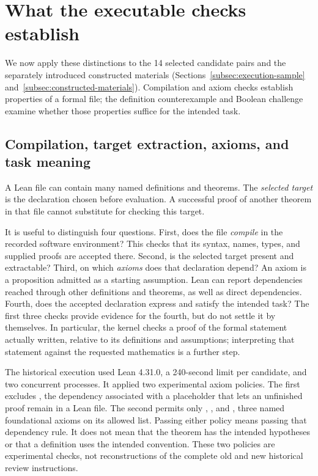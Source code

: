 \section{What the executable checks establish}
\label{sec:audit}
We now apply these distinctions to the 14 selected candidate pairs and the separately introduced constructed materials (Sections~\ref{subsec:execution-sample} and~\ref{subsec:constructed-materials}). Compilation and axiom checks establish properties of a formal file; the definition counterexample and Boolean challenge examine whether those properties suffice for the intended task.

\subsection{Compilation, target extraction, axioms, and task meaning}
\label{subsec:lean-checks}
A Lean file can contain many named definitions and theorems. The \emph{selected target} is the declaration chosen before evaluation. A successful proof of another theorem in that file cannot substitute for checking this target.

It is useful to distinguish four questions. First, does the file \emph{compile} in the recorded software environment? This checks that its syntax, names, types, and supplied proofs are accepted there. Second, is the selected target present and extractable? Third, on which \emph{axioms} does that declaration depend? An axiom is a proposition admitted as a starting assumption. Lean can report dependencies reached through other definitions and theorems, as well as direct dependencies. Fourth, does the accepted declaration express and satisfy the intended task? The first three checks provide evidence for the fourth, but do not settle it by themselves. In particular, the kernel checks a proof of the formal statement actually written, relative to its definitions and assumptions; interpreting that statement against the requested mathematics is a further step\cite{leanaxioms,leanvalidation}.

The historical execution used Lean 4.31.0, a 240-second limit per candidate, and two concurrent processes. It applied two experimental axiom policies. The first excludes , the dependency associated with a placeholder that lets an unfinished proof remain in a Lean file. The second permits only , , and , three named foundational axioms on its allowed list. Passing either policy means passing that dependency rule. It does not mean that the theorem has the intended hypotheses or that a definition uses the intended convention. These two policies are experimental checks, not reconstructions of the complete old and new historical review instructions.

